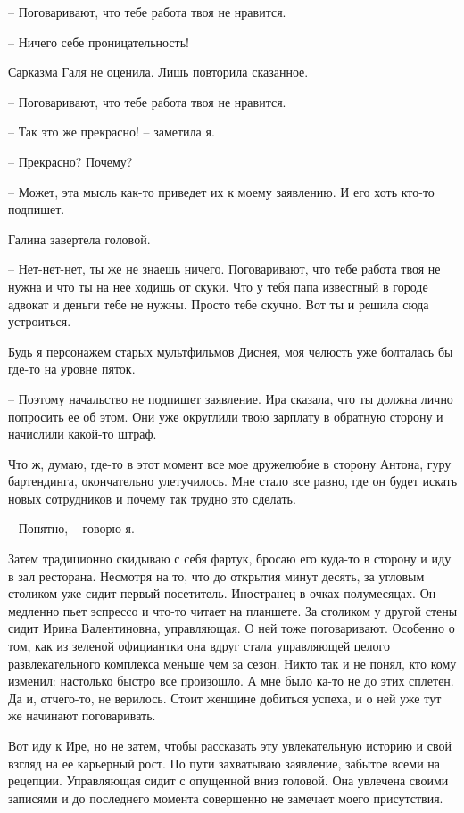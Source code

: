 \documentclass[
]{book}
\begin{document}
-- Поговаривают, что тебе работа твоя не нравится.

-- Ничего себе проницательность!

Сарказма Галя не оценила. Лишь повторила сказанное.

-- Поговаривают, что тебе работа твоя не нравится.

-- Так это же прекрасно! -- заметила я.

-- Прекрасно? Почему?

-- Может, эта мысль как-то приведет их к моему заявлению. И его хоть кто-то подпишет.

Галина завертела головой.

-- Нет-нет-нет, ты же не знаешь ничего. Поговаривают, что тебе работа твоя не нужна и что ты на нее ходишь от скуки. Что у тебя папа известный в городе адвокат и деньги тебе не нужны. Просто тебе скучно. Вот ты и решила сюда устроиться.

Будь я персонажем старых мультфильмов Диснея, моя челюсть уже болталась бы где-то на уровне пяток.

-- Поэтому начальство не подпишет заявление. Ира сказала, что ты должна лично попросить ее об этом. Они уже округлили твою зарплату в обратную сторону и начислили какой-то штраф.

Что ж, думаю, где-то в этот момент все мое дружелюбие в сторону Антона, гуру бартендинга, окончательно улетучилось. Мне стало все равно, где он будет искать новых сотрудников и почему так трудно это сделать.

-- Понятно, -- говорю я.

Затем традиционно скидываю с себя фартук, бросаю его куда-то в сторону и иду в зал ресторана. Несмотря на то, что до открытия минут десять, за угловым столиком уже сидит первый посетитель. Иностранец в очках-полумесяцах. Он медленно пьет эспрессо и что-то читает на планшете. За столиком у другой стены сидит Ирина Валентиновна, управляющая. О ней тоже поговаривают. Особенно о том, как из зеленой официантки она вдруг стала управляющей целого развлекательного комплекса меньше чем за сезон. Никто так и не понял, кто кому изменил: настолько быстро все произошло. А мне было ка-то не до этих сплетен. Да и, отчего-то, не верилось. Стоит женщине добиться успеха, и о ней уже тут же начинают поговаривать.

Вот иду к Ире, но не затем, чтобы рассказать эту увлекательную историю и свой взгляд на ее карьерный рост. По пути захватываю заявление, забытое всеми на рецепции. Управляющая сидит с опущенной вниз головой. Она увлечена своими записями и до последнего момента совершенно не замечает моего присутствия.
\end{document}
